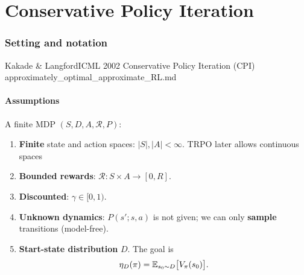 \clearpage
\part{Conservative Policy Iteration}


\section{Setting and notation}

  {Kakade \& Langford}{ICML 2002}
  {Conservative Policy Iteration (CPI)}
  {approximately\_optimal\_approximate\_RL.md}

\subsection{Assumptions}

A finite MDP $(S, D, A, \mathcal{R}, P)$:

\begin{enumerate}
  \item \textbf{Finite} state and action spaces: $|S|, |A| < \infty$. \hfill {\footnotesize\color{NoteGray}TRPO later allows continuous spaces}
  \item \textbf{Bounded rewards}: $\mathcal{R}: S \times A \to [0, R]$.
  \item \textbf{Discounted}: $\gamma \in [0,1)$.
  \item \textbf{Unknown dynamics}: $P(s';s,a)$ is not given; we can only \textbf{sample} transitions (model-free).
  \item \textbf{Start-state distribution} $D$. The goal is
  \begin{gather*}
    \eta_D(\pi) = \mathbb{E}_{s_0\sim D}\big[V_\pi(s_0)\big].
  \end{gather*}
\end{enumerate}

